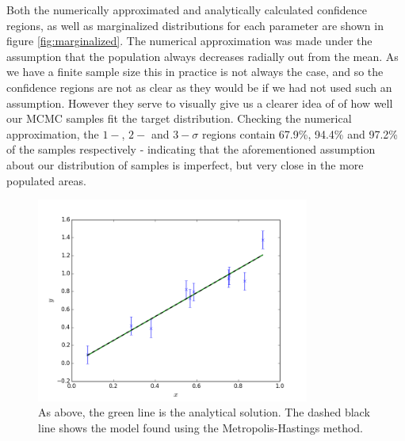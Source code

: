 \documentclass[a4paper,11pt,twoside]{article}
\begin{document}
Both the numerically approximated and
analytically calculated confidence regions, as well as marginalized
distributions for each parameter are shown in figure \ref{fig:marginalized}. The numerical approximation was made under
the assumption that the population always decreases radially out from the mean.
As we have a finite sample size this in practice is not always the case, and so
the confidence regions are not as clear as they would be if we had not used
such an assumption. However they serve to visually give us a clearer idea of of
how well our MCMC samples fit the target distribution. Checking the numerical
approximation, the $1-$, $2-$ and $3-\sigma$ regions contain 67.9\%, 94.4\% and
97.2\% of the samples respectively - indicating that the aforementioned
assumption about our distribution of samples is imperfect, but very close in the more populated areas.

\begin{figure}[!ht]
	\centering
	\includegraphics[width=0.8\textwidth]{2ddata-mcmc.png}
	\caption{As above, the green line is the analytical solution. The
	dashed black line shows the model found using the Metropolis-Hastings
	method.}
	\label{fig:model-mcmc}
\end{figure}
\end{document}
